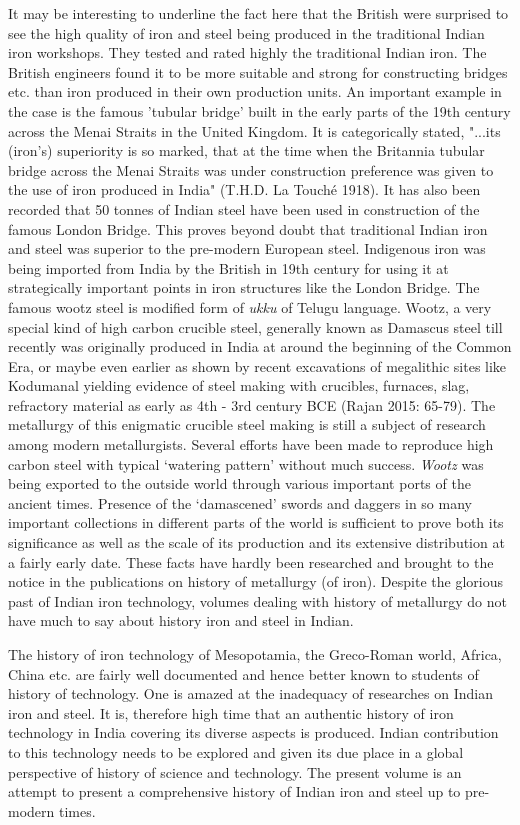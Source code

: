 It may be interesting to underline the fact here that the British were surprised to see the high quality of iron and steel being produced in the traditional Indian iron workshops. They tested and rated highly the traditional Indian iron. The British engineers found it to be more suitable and strong for constructing bridges etc. than iron produced in their own production units. An important example in the case is the famous 'tubular bridge' built in the early parts of the 19th century across the Menai Straits in the United Kingdom. It is categorically stated, "...its (iron's) superiority is so marked, that at the time when the Britannia tubular bridge across the Menai Straits was under construction preference was given to the use of iron produced in India" (T.H.D. La Touché 1918). It has also been recorded that 50 tonnes of Indian steel have been used in construction of the famous London Bridge. This proves beyond doubt that traditional Indian iron and steel was superior to the pre-modern European steel. Indigenous iron was being imported from India by the British in 19th century for using it at strategically important points in iron structures like the London Bridge. The famous wootz steel is modified form of \textit{ukku} of Telugu language. Wootz, a very special kind of high carbon crucible steel, generally known as Damascus steel till recently was originally produced in India at around the beginning of the Common Era, or maybe even earlier as shown by recent excavations of megalithic sites like Kodumanal yielding evidence of steel making with crucibles, furnaces, slag, refractory material as early as 4th - 3rd century BCE (Rajan 2015: 65-79). The metallurgy of this enigmatic crucible steel making is still a subject of research among modern metallurgists. Several efforts have been made to reproduce high carbon steel with typical `watering pattern' without much success. \textit{Wootz} was being exported to the outside world through various important ports of the ancient times. Presence of the `damascened' swords and daggers in so many important collections in different parts of the world is sufficient to prove both its significance as well as the scale of its production and its extensive distribution at a fairly early date. These facts have hardly been researched and brought to the notice in the publications on history of metallurgy (of iron). Despite the glorious past of Indian iron technology, volumes dealing with history of metallurgy do not have much to say about history iron and steel in Indian.

The history of iron technology of Mesopotamia, the Greco-Roman world, Africa, China etc. are fairly well documented and hence better known to students of history of technology. One is amazed at the inadequacy of researches on Indian iron and steel. It is, therefore high time that an authentic history of iron technology in India covering its diverse aspects is produced. Indian contribution to this technology needs to be explored and given its due place in a global perspective of history of science and technology. The present volume is an attempt to present a comprehensive history of Indian iron and steel up to pre-modern times.

